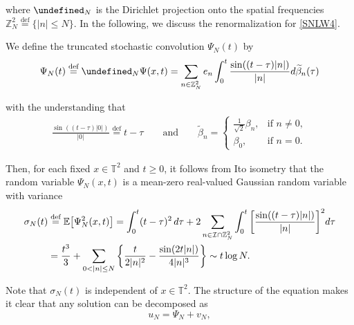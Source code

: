 \documentclass[letterpaper, 11pt,  reqno]{amsart}
\newcommand{\1}{\hspace{0.5mm}\text{I}\hspace{0.5mm}}
\newcommand{\I}{\mathcal{I}}
\newcommand{\noi}{\noindent}
\newcommand{\Z}{\mathbb{Z}}
\newcommand{\T}{\mathbb{T}}
\let\P= \undefined
\newcommand{\P}{\mathbf{P}}
\newcommand{\E}{\mathbb{E}}
\newcommand{\be}{\beta}
\newcommand{\s}{\sigma}
\newcommand{\wt}{\widetilde}
\numberwithin{equation}{section}
\numberwithin{theorem}{section}
\newcommand{\notemax}[1]{\marginpar{\color{red} $\Leftarrow\Leftarrow\Leftarrow$}{\color{red}MAX: #1}}
\newcommand{\hiro}[1]{\marginpar{\color{red} $\Leftarrow\Leftarrow\Leftarrow$}{\smallskip \noi\color{blue}HIRO: #1}\smallskip}
\begin{document}
\noi
where  $\P_N$ is the Dirichlet projection onto the spatial frequencies $\Z^2_N \stackrel{\text{def}}{=} \{|n|\leq N\}$.
In the following, we discuss the renormalization for   \eqref{SNLW4}.

We define 
 the truncated stochastic convolution $\Psi_N(t)$ by 
\begin{align} 
\Psi_N(t) \stackrel{\text{def}}{=}  \P_N \Psi(x, t)
 = \sum_{n \in \mathbb{Z}^2_N} e_n 
   \int_0^t \frac{\sin ((t - \tau) | n |)}{| n |} d \wt \beta_n (\tau) 
\label{G0}
\end{align}   


\noi
with the understanding that
\begin{align}
\frac{\sin ((t - \tau) | 0 |)}{| 0 |} \stackrel{\text{def}}{=} t-\tau
\qquad \text{and}\qquad
 \wt \be_n = \begin{cases}
\frac{1}{\sqrt{2}}\be_n, & \text{if }n \ne 0, \\
\be_0, & \text{if } n = 0.
\end{cases}
\label{G0a}
\end{align}


%

\noi
Then, 
for each fixed $x \in \T^2$ and $t \geq 0$,  
 it follows from  Ito isometry
that the random variable $\Psi_N(x, t)$
 is a mean-zero real-valued Gaussian random variable with variance
\begin{align}
\s_N(t) &  \stackrel{\text{def}}{=} \E \big[\Psi_N^2(x, t)\big]
 = \int_0^t (t-\tau)^2\, d\tau
+ 2 \sum_{n \in \I \cap \Z^2_N}%
\int_0^t \bigg[\frac{\sin((t - \tau)|n|)}{|n|} \bigg]^2 d\tau
\notag \\
& = \frac{t^3}{3} +  \sum_{0< |n|\leq N} \bigg\{ \frac{t}{2 |n|^2} - \frac{\sin (2 t |n|)}{4|n|^3 }\bigg\}\sim  t \log N.
\label{sig1}
\end{align}


%


\noi
Note that $\s_N(t)$ is independent of $x \in \T^2$.
The structure of the equation makes it clear that any solution can be decomposed as 
\begin{equation}
\label{eq:ansatz}
u_N = \Psi_N + v_N, 
\end{equation}
\end{document}
